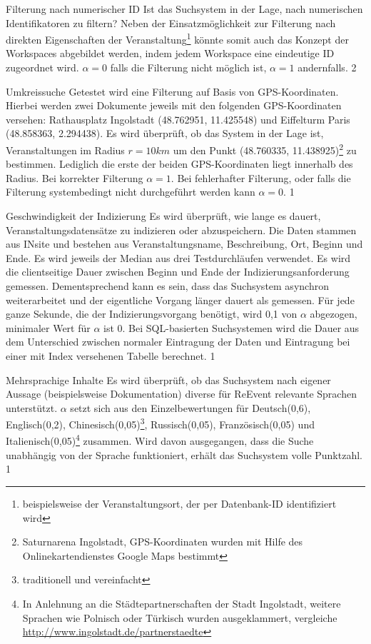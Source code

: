 \myTestDefinition
{Filterung nach numerischer ID}
{
Ist das Suchsystem in der Lage, nach numerischen Identifikatoren zu filtern? Neben der Einsatzmöglichkeit zur Filterung nach direkten Eigenschaften der Veranstaltung\footnote{beispielsweise der Veranstaltungsort, der per Datenbank-ID identifiziert wird} könnte somit auch das Konzept der Workspaces abgebildet werden, indem jedem Workspace eine eindeutige ID zugeordnet wird.
}
{
$\alpha = 0$ falls die Filterung nicht möglich ist, $\alpha = 1$ andernfalls.
}
{2}

\myTestDefinition
{Umkreissuche}
{
Getestet wird eine Filterung auf Basis von GPS-Koordinaten. Hierbei werden zwei Dokumente jeweils mit den folgenden GPS-Koordinaten versehen:
Rathausplatz Ingolstadt (48.762951, 11.425548) und Eiffelturm Paris (48.858363, 2.294438). Es wird überprüft, ob das System in der Lage ist, Veranstaltungen im Radius $r = 10km$ um den Punkt (48.760335, 11.438925)\footnote{Saturnarena Ingolstadt, GPS-Koordinaten wurden mit Hilfe des Onlinekartendienstes Google Maps bestimmt} zu bestimmen. Lediglich die erste der beiden GPS-Koordinaten liegt innerhalb des Radius.}
{Bei korrekter Filterung $\alpha = 1$. Bei fehlerhafter Filterung, oder falls die Filterung systembedingt nicht durchgeführt werden kann $\alpha = 0$.}
{1}


\myTestDefinition
{Geschwindigkeit der Indizierung}
{
Es wird überprüft, wie lange es dauert,  Veranstaltungsdatensätze zu indizieren oder abzuspeichern. Die Daten stammen aus INsite und bestehen aus Veranstaltungsname, Beschreibung, Ort, Beginn und Ende. Es wird jeweils der Median aus drei Testdurchläufen verwendet. Es wird die clientseitige Dauer zwischen Beginn und Ende der Indizierungsanforderung gemessen. Dementsprechend kann es sein, dass das Suchsystem asynchron weiterarbeitet und der eigentliche Vorgang länger dauert als gemessen.
}
{
Für jede ganze Sekunde, die der Indizierungsvorgang benötigt, wird 0,1 von $\alpha$ abgezogen, minimaler Wert für $\alpha$ ist 0. Bei SQL-basierten Suchsystemen wird die Dauer aus dem Unterschied zwischen normaler Eintragung der Daten und Eintragung bei einer mit Index versehenen Tabelle berechnet.
}
{1}

\myTestDefinition
{Mehrsprachige Inhalte}
{
Es wird überprüft, ob das Suchsystem nach eigener Aussage (beispielsweise Dokumentation) diverse für ReEvent relevante Sprachen unterstützt.
}
{$\alpha$ setzt sich aus den Einzelbewertungen für Deutsch(0,6), Englisch(0,2), Chinesisch(0,05)\footnote{traditionell und vereinfacht}, Russisch(0,05), Französisch(0,05) und Italienisch(0,05)\footnote{In Anlehnung an die Städtepartnerschaften der Stadt Ingolstadt, weitere Sprachen wie Polnisch oder Türkisch wurden ausgeklammert, vergleiche \url{http://www.ingolstadt.de/partnerstaedte}} zusammen. Wird davon ausgegangen, dass die Suche unabhängig von der Sprache funktioniert, erhält das Suchsystem volle Punktzahl.}
{1}

